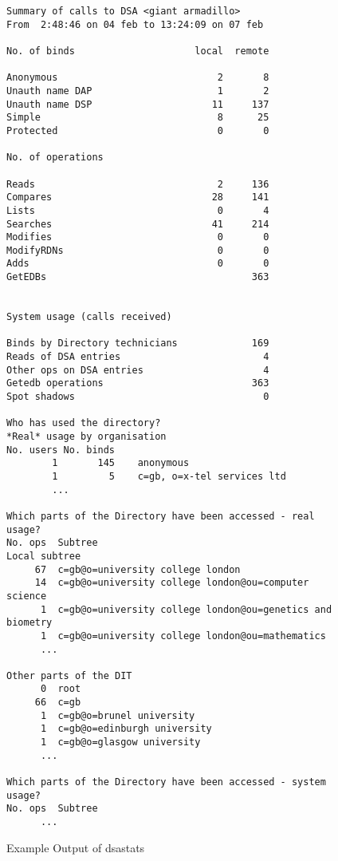 \begin{figure}
\begin{footnotesize}\begin{verbatim}
Summary of calls to DSA <giant armadillo>
From  2:48:46 on 04 feb to 13:24:09 on 07 feb

No. of binds                     local  remote

Anonymous                            2       8
Unauth name DAP                      1       2
Unauth name DSP                     11     137
Simple                               8      25
Protected                            0       0

No. of operations

Reads                                2     136
Compares                            28     141
Lists                                0       4
Searches                            41     214
Modifies                             0       0
ModifyRDNs                           0       0
Adds                                 0       0
GetEDBs                                    363


System usage (calls received)

Binds by Directory technicians             169
Reads of DSA entries                         4
Other ops on DSA entries                     4
Getedb operations                          363
Spot shadows                                 0

Who has used the directory?
*Real* usage by organisation
No. users No. binds
        1       145    anonymous
        1         5    c=gb, o=x-tel services ltd
        ...

Which parts of the Directory have been accessed - real usage?
No. ops  Subtree
Local subtree
     67  c=gb@o=university college london
     14  c=gb@o=university college london@ou=computer science
      1  c=gb@o=university college london@ou=genetics and biometry
      1  c=gb@o=university college london@ou=mathematics
      ...

Other parts of the DIT
      0  root
     66  c=gb
      1  c=gb@o=brunel university
      1  c=gb@o=edinburgh university
      1  c=gb@o=glasgow university
      ...

Which parts of the Directory have been accessed - system usage?
No. ops  Subtree
      ...
\end{verbatim}
\end{footnotesize}
\caption{Example Output of dsastats}
\label{dsastat:example}
\end{figure}

